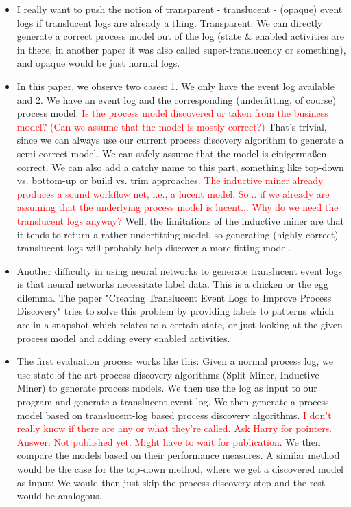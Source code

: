 \documentclass[a4paper,11pt,twoside]{pads-thesis}
\begin{document}
\begin{itemize}
        \item I really want to push the notion of transparent - translucent - (opaque) event logs if translucent logs are already a thing. Transparent: We can directly generate a correct process model out of the log (state \& enabled activities are in there, in another paper it was also called super-translucency or something), and opaque would be just normal logs.
        \item In this paper, we observe two cases: 1. We only have the event log available and 2. We have an event log and the corresponding (underfitting, of course) process model. \textcolor{red}{Is the process model discovered or taken from the business model? (Can we assume that the model is mostly correct?)} That's trivial, since we can always use our current process discovery algorithm to generate a semi-correct model. We can safely assume that the model is einigermaßen correct. We can also add a catchy name to this part, something like top-down vs. bottom-up or build vs. trim approaches. \textcolor{red}{The inductive miner already produces a sound workflow net, i.e.,  a lucent model. So... if we already are assuming that the underlying process model is lucent... Why do we need the translucent logs anyway?} Well, the limitations of the inductive miner are that it tends to return a rather underfitting model, so generating (highly correct) translucent logs will probably help discover a more fitting model.
        
        \item Another difficulty in using neural networks to generate translucent event logs is that neural networks necessitate label data. This is a chicken or the egg dilemma. The paper "Creating Translucent Event Logs to Improve Process Discovery" tries to solve this problem by providing labels to patterns which are in a snapshot which relates to a certain state, or just looking at the given process model and adding every enabled activities.

        \item The first evaluation process works like this: Given a normal process log, we use state-of-the-art process discovery algorithms (Split Miner, Inductive Miner) to generate process models. We then use the log as input to our program and generate a translucent event log. We then generate a process model based on translucent-log based process discovery algorithms. \textcolor{red}{I don't really know if there are any or what they're called. Ask Harry for pointers. Answer: Not published yet. Might have to wait for publication}. We then compare the models based on their performance measures. A similar method would be the case for the top-down method, where we get a discovered model as input: We would then just skip the process discovery step and the rest would be analogous.


\end{itemize}
\end{document}
